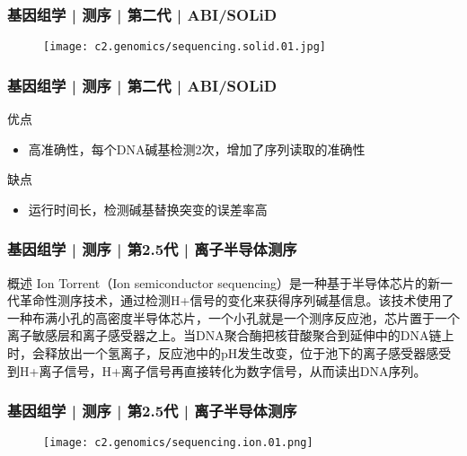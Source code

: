 \begin{frame}
  \frametitle{基因组学 | 测序 | 第二代 | ABI/SOLiD}
  \begin{figure}
    \centering
    \texttt{[image: c2.genomics/sequencing.solid.01.jpg]}
  \end{figure}
\end{frame}

\begin{frame}
  \frametitle{基因组学 | 测序 | 第二代 | ABI/SOLiD}
  \begin{block}{优点}
    \begin{itemize}
      \item 高准确性，每个DNA碱基检测2次，增加了序列读取的准确性
    \end{itemize}
  \end{block}
  \pause
  \begin{block}{缺点}
    \begin{itemize}
      \item 运行时间长，检测碱基替换突变的误差率高
    \end{itemize}
  \end{block}
\end{frame}

\begin{frame}
  \frametitle{基因组学 | 测序 | 第2.5代 | 离子半导体测序}
  \begin{block}{概述}
    Ion Torrent（Ion semiconductor sequencing）是一种基于半导体芯片的新一代革命性测序技术，通过检测H+信号的变化来获得序列碱基信息。该技术使用了一种布满小孔的高密度半导体芯片，一个小孔就是一个测序反应池，芯片置于一个离子敏感层和离子感受器之上。当DNA聚合酶把核苷酸聚合到延伸中的DNA链上时，会释放出一个氢离子，反应池中的pH发生改变，位于池下的离子感受器感受到H+离子信号，H+离子信号再直接转化为数字信号，从而读出DNA序列。
  \end{block}
\end{frame}

\begin{frame}
  \frametitle{基因组学 | 测序 | 第2.5代 | 离子半导体测序}
  \begin{figure}
    \centering
    \texttt{[image: c2.genomics/sequencing.ion.01.png]}
  \end{figure}
\end{frame}


